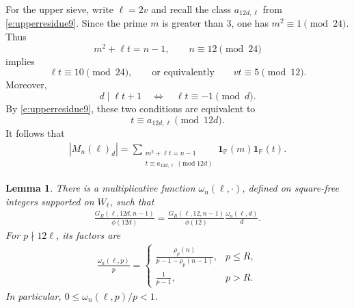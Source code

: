 \documentclass[12pt,reqno]{amsart}
\numberwithin{equation}{section}
\newtheorem{lemma}[equation]{Lemma}
\theoremstyle{definition}
\theoremstyle{remark}
\newcommand{\one}{\mathbf{1}}
\begin{document}
For the upper sieve, write \(\ell=2v\) and recall the class
\(a_{12d,\ell}\) from \eqref{e:upperresidue9}.  Since the prime \(m\)
is greater than \(3\), one has \(m^2\equiv1\pmod{24}\).  Thus
\[
 m^2+\ell t=n-1,\qquad n\equiv12\pmod{24}
\]
implies
\[
 \ell t\equiv10\pmod{24},
 \qquad\text{or equivalently}\qquad
 vt\equiv5\pmod{12}.
\]
Moreover,
\[
 d\mid\ell t+1
 \quad\Longleftrightarrow\quad
 \ell t\equiv-1\pmod d.
\]
By \eqref{e:upperresidue9}, these two conditions are equivalent to
\[
 t\equiv a_{12d,\ell}\pmod{12d}.
\]
It follows that
\begin{align}\label{e:upperexact10}
 |M_n(\ell)_d|
 =
 \sum_{\substack{m^2+\ell t=n-1\\
 t\equiv a_{12d,\ell}\;(\mathrm{mod}\;12d)}}
 \one_{\mathbb P}(m)\one_{\mathbb P}(t).
\end{align}


\begin{lemma}\label{l:upperlocaldensity}
There is a multiplicative function
\(\omega_n(\ell,\cdot)\), defined on square-free integers supported on
\(W_\ell\), such that
\begin{align}\label{e:upperfactorization10}
 \frac{G_R(\ell,12d,n-1)}{\phi(12d)}
 =
 \frac{G_R(\ell,12,n-1)}{\phi(12)}
 \frac{\omega_n(\ell,d)}d .
\end{align}
For \(p\nmid12\ell\), its  factors are
\begin{align}\label{e:upperlocaldensity10}
 \frac{\omega_n(\ell,p)}p
 =
 \begin{cases}
 \displaystyle
 \frac{\rho_p(n)}{p-1-\rho_p(n-1)},&p\leq R,\\[7pt]
 \displaystyle\frac1{p-1},&p>R.
 \end{cases}
\end{align}
In particular, \(0\leq\omega_n(\ell,p)/p<1\).
\end{lemma}
\end{document}
